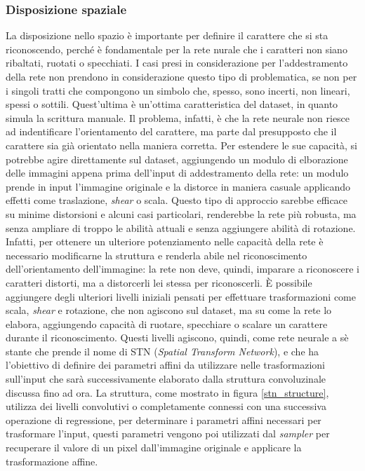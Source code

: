 \documentclass[a4paper,12pt]{article}
\begin{document}
\subsubsection{Disposizione spaziale}
La disposizione nello spazio è importante per definire il carattere che si sta riconoscendo, perché è fondamentale per la rete nurale che i caratteri non siano ribaltati, ruotati o specchiati. I casi presi in considerazione per l'addestramento della rete non prendono in considerazione questo tipo di problematica, se non per i singoli tratti che compongono un simbolo che, spesso, sono incerti, non lineari, spessi o sottili. Quest'ultima è un'ottima caratteristica del dataset, in quanto simula la scrittura manuale. Il problema, infatti, è che la rete neurale non riesce ad indentificare l'orientamento del carattere, ma parte dal presupposto che il carattere sia già orientato nella maniera corretta. %
Per estendere le sue capacità, si potrebbe agire direttamente sul dataset, aggiungendo un modulo di elborazione delle immagini appena prima dell'input di addestramento della rete: un modulo prende in input l'immagine originale e la distorce in maniera casuale applicando effetti come traslazione, \textit{shear} o scala. Questo tipo  di approccio sarebbe efficace su minime distorsioni e alcuni casi particolari, renderebbe la rete più robusta, ma senza ampliare di troppo le abilità attuali e senza aggiungere abilità di rotazione.
Infatti, per ottenere un ulteriore potenziamento nelle capacità della rete è necessario modificarne la struttura e renderla abile nel riconoscimento dell'orientamento dell'immagine: la rete non deve, quindi, imparare a riconoscere i caratteri distorti, ma a distorcerli lei stessa per riconoscerli.
È possibile aggiungere degli ulteriori livelli iniziali pensati per effettuare trasformazioni come scala, \textit{shear} e rotazione, che non agiscono sul dataset, ma su come la rete lo elabora, aggiungendo capacità di ruotare, specchiare o scalare un carattere durante il riconoscimento.
Questi livelli agiscono, quindi, come rete neurale a sè stante che prende il nome di STN (\textit{Spatial Transform Network}), e che ha l'obiettivo di definire dei parametri affini da utilizzare nelle trasformazioni sull'input che sarà successivamente elaborato dalla struttura convoluzinale discussa fino ad ora.
La struttura, come mostrato in figura \ref{stn_structure}, utilizza dei livelli convolutivi o completamente connessi con una successiva operazione di regressione, per determinare i parametri affini necessari per trasformare l'input, questi parametri vengono poi utilizzati dal \textit{sampler} per recuperare il valore di un pixel dall'immagine originale e applicare la trasformazione affine.
\end{document}
